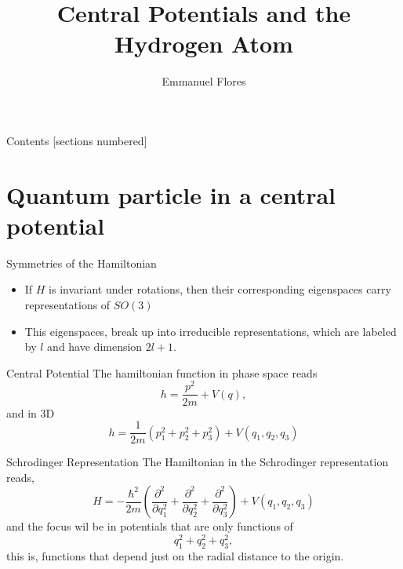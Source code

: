 \documentclass[12pt]{beamer}
\title{Central Potentials and the Hydrogen Atom}
\author{Emmanuel Flores}
\institute{Advanced Mathematical Methods, 
		   \\Tufts University}
\begin{document}
\maketitle
\begin{frame}{Contents}
	[sections numbered]
	\tableofcontents
\end{frame}
\section[Quantum particle in a central potential]{Quantum particle in a central potential}
\begin{frame}{Symmetries of the Hamiltonian}
	\begin{itemize}
		\item If $H$ is invariant under rotations, then their corresponding eigenspaces carry representations of $SO(3)$
		\item This eigenspaces, break up into irreducible representations, which are labeled by $l$ and have dimension $2l + 1$.
	\end{itemize}
\end{frame}

\begin{frame}{Central Potential}
The hamiltonian function in phase space reads
\begin{displaymath}
  h = \frac{p^2}{2m} + V(q),
\end{displaymath}
and in 3D
\begin{displaymath}
 h = \frac{1}{2m}(p_{1}^2+p_{2}^2+p_{3}^2) + V(q_1,q_2,q_3)
\end{displaymath}
\end{frame}

\begin{frame}{Schrodinger Representation}
The Hamiltonian in the Schrodinger representation reads,
\begin{displaymath}
H = -\frac{\hbar^2}{2m}(\frac{\partial ^2}{\partial q_1^2} + \frac{\partial ^2}{\partial q_2^2}+\frac{\partial ^2}{\partial q_3^2}) + V(q_1,q_2,q_3) 	
\end{displaymath}
and the focus wil be in potentials that are only functions of
\begin{displaymath}
q_1^2 + q_2^2 + q_3^2,
\end{displaymath}
this is, functions that depend just on the radial distance to the origin.
\end{frame}
\end{document}
